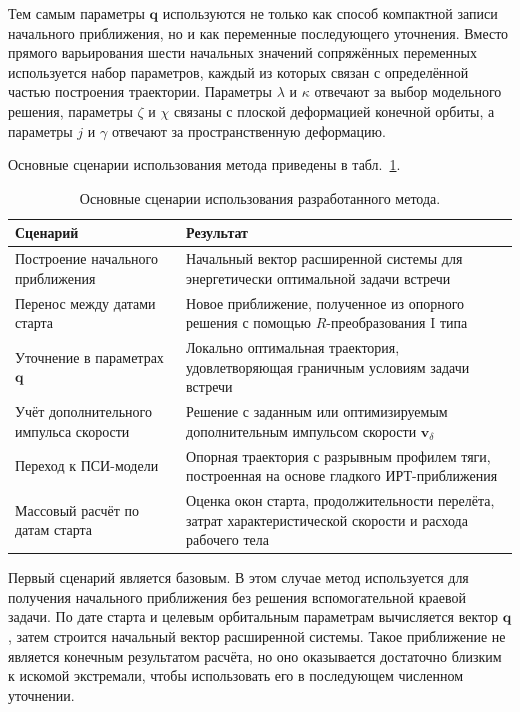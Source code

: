 Тем самым параметры \(\mathbf q\) используются не только как способ компактной записи начального приближения, но и как переменные последующего уточнения. Вместо прямого варьирования шести начальных значений сопряжённых переменных используется набор параметров, каждый из которых связан с определённой частью построения траектории. Параметры \(\lambda\) и \(\kappa\) отвечают за выбор модельного решения, параметры \(\zeta\) и \(\chi\) связаны с плоской деформацией конечной орбиты, а параметры \(j\) и \(\gamma\) отвечают за пространственную деформацию.

Основные сценарии использования метода приведены в табл.~\ref{tab:ch4_usage_scenarios}.

\begin{table}[ht]
	\centering
	\caption{Основные сценарии использования разработанного метода.}
	\label{tab:ch4_usage_scenarios}
	\begin{tabular}{p{}p{}}
		\toprule
		Сценарий & Результат \\
		\midrule
		Построение начального приближения & Начальный вектор расширенной системы для энергетически оптимальной задачи встречи \\
		Перенос между датами старта & Новое приближение, полученное из опорного решения с помощью \(R\)-преобразования I типа \\
		Уточнение в параметрах \(\mathbf q\) & Локально оптимальная траектория, удовлетворяющая граничным условиям задачи встречи \\
		Учёт дополнительного импульса скорости & Решение с заданным или оптимизируемым дополнительным импульсом скорости \(\mathbf v_\delta\) \\
		Переход к ПСИ-модели & Опорная траектория с разрывным профилем тяги, построенная на основе гладкого ИРТ-приближения \\
		Массовый расчёт по датам старта & Оценка окон старта, продолжительности перелёта, затрат характеристической скорости и расхода рабочего тела \\
		\bottomrule
	\end{tabular}
\end{table}

Первый сценарий является базовым. В этом случае метод используется для получения начального приближения без решения вспомогательной краевой задачи. По дате старта и целевым орбитальным параметрам вычисляется вектор \(\mathbf q\), затем строится начальный вектор расширенной системы. Такое приближение не является конечным результатом расчёта, но оно оказывается достаточно близким к искомой экстремали, чтобы использовать его в последующем численном уточнении.

